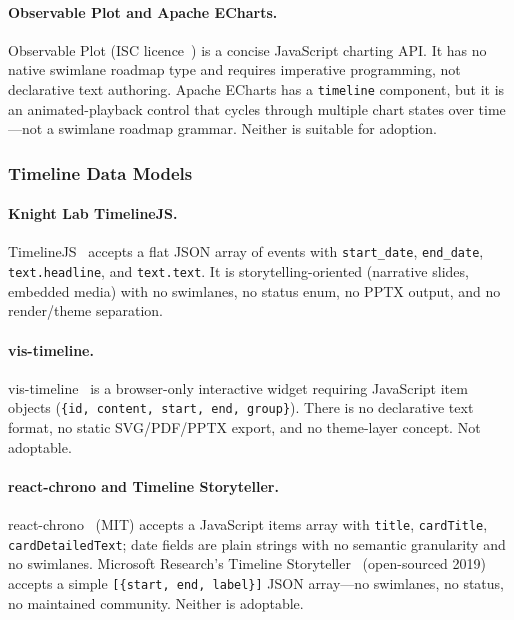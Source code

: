 \paragraph{Observable Plot and Apache ECharts.}
Observable Plot (ISC licence~\cite{observable-plot}) is a concise JavaScript
charting API. It has no native swimlane roadmap type and requires imperative
programming, not declarative text authoring. Apache ECharts has a
\texttt{timeline} component, but it is an animated-playback control that cycles
through multiple chart states over time---not a swimlane roadmap grammar.
Neither is suitable for adoption.

\subsubsection{Timeline Data Models}

\paragraph{Knight Lab TimelineJS.}
TimelineJS~\cite{timelinejs} accepts a flat JSON array of events with
\texttt{start\_date}, \texttt{end\_date}, \texttt{text.headline}, and
\texttt{text.text}. It is storytelling-oriented (narrative slides, embedded
media) with no swimlanes, no status enum, no PPTX output, and no render/theme
separation.

\paragraph{vis-timeline.}
vis-timeline~\cite{vistimeline} is a browser-only interactive widget requiring
JavaScript item objects (\texttt{\{id, content, start, end, group\}}). There is
no declarative text format, no static SVG/PDF/PPTX export, and no theme-layer
concept. Not adoptable.

\paragraph{react-chrono and Timeline Storyteller.}
react-chrono~\cite{react-chrono} (MIT) accepts a JavaScript items array with
\texttt{title}, \texttt{cardTitle}, \texttt{cardDetailedText}; date fields are
plain strings with no semantic granularity and no swimlanes. Microsoft
Research's Timeline Storyteller~\cite{timeline-storyteller} (open-sourced 2019)
accepts a simple \texttt{[\{start, end, label\}]} JSON array---no swimlanes,
no status, no maintained community. Neither is adoptable.

